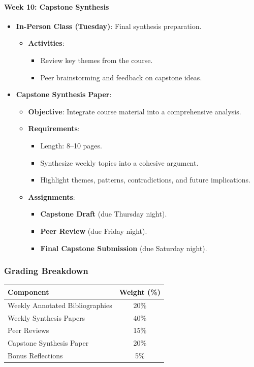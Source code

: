 \documentclass[12pt, letterpaper]{article}
\begin{document}
\paragraph{Week 10: Capstone Synthesis}
\begin{itemize}
    \item \textbf{In-Person Class (Tuesday)}: Final synthesis preparation.
    \begin{itemize}
        \item \textbf{Activities}:
        \begin{itemize}
            \item Review key themes from the course.
            \item Peer brainstorming and feedback on capstone ideas.
        \end{itemize}
    \end{itemize}
    \item \textbf{Capstone Synthesis Paper}:
    \begin{itemize}
        \item \textbf{Objective}: Integrate course material into a comprehensive analysis.
        \item \textbf{Requirements}:
        \begin{itemize}
            \item Length: 8–10 pages.
            \item Synthesize weekly topics into a cohesive argument.
            \item Highlight themes, patterns, contradictions, and future implications.
        \end{itemize}
        \item \textbf{Assignments}:
        \begin{itemize}
            \item \textbf{Capstone Draft} (due Thursday night).
            \item \textbf{Peer Review} (due Friday night).
            \item \textbf{Final Capstone Submission} (due Saturday night).
        \end{itemize}
    \end{itemize}
\end{itemize}

\subsubsection*{Grading Breakdown}
\begin{table}[h!]
\centering
\begin{tabular}{|l|c|}
\hline
\textbf{Component} & \textbf{Weight (\%)} \\
\hline
Weekly Annotated Bibliographies & 20\% \\
Weekly Synthesis Papers & 40\% \\
Peer Reviews & 15\% \\
Capstone Synthesis Paper & 20\% \\
Bonus Reflections & 5\% \\
\hline
\end{tabular}
\end{table}
\end{document}
